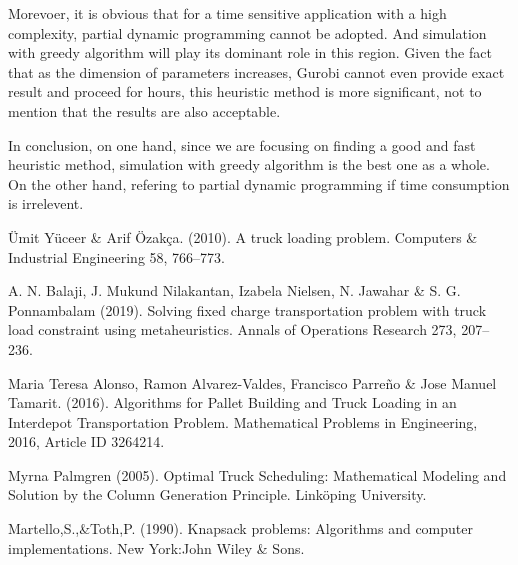 \documentclass{article}
\begin{document}
Morevoer, it is obvious that for a time sensitive application with a high complexity, partial dynamic programming cannot be adopted. And simulation with greedy algorithm will play its dominant role in this region. Given the fact that as the dimension of parameters increases, Gurobi cannot even provide exact result and proceed for hours, this heuristic method is more significant, not to mention that the results are also acceptable.

In conclusion, on one hand, since we are focusing on finding a good and fast heuristic method, simulation with greedy algorithm is the best one as a whole. On the other hand, refering to partial dynamic programming if time consumption is irrelevent. 

  

\begin{thebibliography}{1}

Ümit Yüceer \& Arif Özakça. (2010). 
\newblock A truck loading problem. Computers \& Industrial Engineering 58, 766–773.

A. N. Balaji, J. Mukund Nilakantan, Izabela Nielsen, N. Jawahar \& S. G. Ponnambalam (2019).
\newblock Solving fixed charge transportation problem with truck load constraint using metaheuristics. Annals of Operations Research 273, 207–236.

Maria Teresa Alonso, Ramon Alvarez-Valdes, Francisco Parreño \& Jose Manuel Tamarit. (2016).
\newblock Algorithms for Pallet Building and Truck Loading in an Interdepot Transportation Problem. Mathematical Problems in Engineering, 2016, Article ID 3264214.

Myrna Palmgren (2005).
\newblock Optimal Truck Scheduling: Mathematical Modeling and Solution by the Column Generation Principle. Linköping University.

Martello,S.,\&Toth,P. (1990).
\newblock Knapsack problems: Algorithms and computer implementations. New York:John Wiley \& Sons.

\end{thebibliography}
\end{document}
